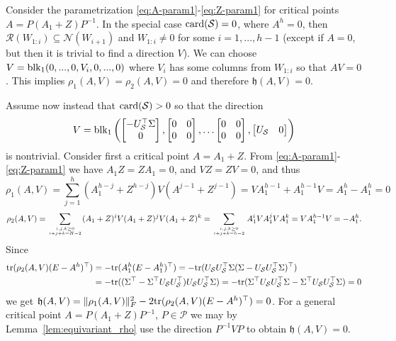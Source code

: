 \documentclass{article}
\makeatletter
\renewenvironment{proof}[1][\proofname]{
  \par\pushQED{\qed}\normalfont
  \topsep6\p@\@plus6\p@\relax
  \trivlist\item[\hskip\labelsep\bfseries#1\@addpunct{.}]
  \ignorespaces
}{
  \popQED\endtrivlist\@endpefalse
}
\def\tr{{\rm tr}}
\def\block{{\rm blk}}
\newcommand{\1}{\mathds{1}}
\makeatother
\begin{document}
\begin{proof}
Consider the parametrization \eqref{eq:A-param1}-\eqref{eq:Z-param1} for critical points $ A = P ( A_1 + Z ) P^{-1} $. In the special case $ {\rm card}(\mathcal{S}) = 0 $, where $ A^h = 0 $, then $ \mathcal{R}(W_{1:i}) \subseteq \mathcal{N}(W_{i+1}) $ and $ W_{1:i} \neq 0 $ for some $ i = 1,...,h-1 $ (except if $ A = 0 $, but then it is trivial to find a direction $ V $). We can choose $ V=\block_1(0,...,0,V_i,0,...,0)$ where $ V_i $ has some columns from $ W_{1:i} $ so that $ A V = 0 $. This implies $ \rho_1(A,V) = \rho_2(A,V) = 0$ and therefore $ \mathfrak{h}(A,V) = 0$.

Assume now instead that $ {\rm card}(\mathcal{S}) > 0 $ so that the direction
\begin{equation*}
	V = \block_1 \left( \begin{bmatrix} -U_\mathcal{S}^\top \Sigma \\ 0 \end{bmatrix}, \begin{bmatrix} 0 & 0 \\ 0 & 0 \end{bmatrix} , \ldots  \begin{bmatrix} 0 & 0 \\ 0 & 0 \end{bmatrix} ,  \begin{bmatrix}  U_\mathcal{S} & 0  \end{bmatrix} \right)
\end{equation*}
is nontrivial. Consider first a critical point $ A = A_1 + Z $. From \eqref{eq:A-param1}-\eqref{eq:Z-param1} we have $ A_1 Z = Z A_1 = 0 $, and $ VZ = ZV = 0 $, and thus
\begin{equation*} 
		\rho_1(A,V) = \sum_{j=1}^{h} (A_1^{h-j} + Z^{h-j}) V ( A^{j-1} + Z^{j-1} ) = VA_1^{h-1} + A_1^{h-1}V = A_1^h - A_1^h = 0
\end{equation*}
\begin{equation*} 
    \rho_2(A,V) = \sum_{i,j,k\geq 0 \atop i+j+k=H-2} (A_1+Z)^{i} V (A_1+Z)^{j} V (A_1+Z)^k = \sum_{i,j,k\geq 0 \atop i+j+k=h-2} A_1^{i} V A_1^{j}V A_1^k = V A_1^{h-1} V = -A_1^h.
\end{equation*}
Since
\begin{align*}
    \tr{( \rho_2(A,V) ( E - A^h )^\top )} & = -\tr{( A_1^h ( E - A_1^h )^\top )} = -\tr{( U_\mathcal{S} U_\mathcal{S}^\top \Sigma ( \Sigma - U_\mathcal{S} U_\mathcal{S}^\top \Sigma )^\top )} \\
    & = -\tr{(  ( \Sigma^\top -  \Sigma^\top U_\mathcal{S}  U_\mathcal{S}^\top ) U_\mathcal{S} U_\mathcal{S}^\top \Sigma)} = -\tr{(  \Sigma^\top U_\mathcal{S} U_\mathcal{S}^\top \Sigma -  \Sigma^\top U_\mathcal{S}   U_\mathcal{S}^\top \Sigma)} = 0
\end{align*}
we get $ \mathfrak{h}(A,V) = \lVert \rho_1(A,V)  \rVert_F^2 - 2 \tr{( \rho_2(A,V) ( E - A^h )^\top )} = 0  $. For a general critical point $ A = P( A_1 + Z ) P^{-1} $, $ P \in \mathcal{P} $ we may by Lemma~\ref{lem:equivariant_rho} use the direction $ P^{-1} V P $ to obtain $ \mathfrak{h}(A,V) = 0 $.
\end{proof}
\end{document}
